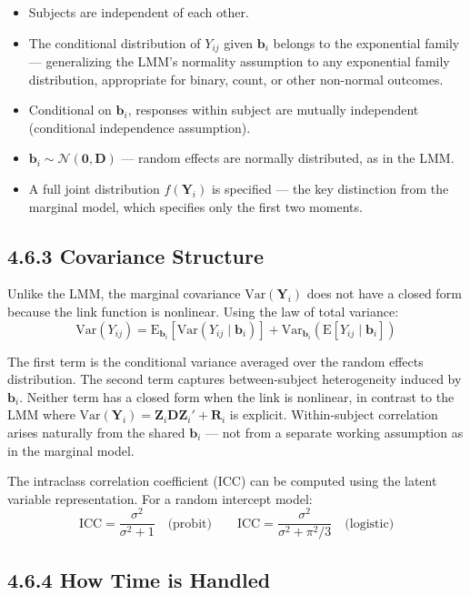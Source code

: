 \documentclass[11pt]{article}
\newcommand{\bY}{\mathbf{Y}}
\newcommand{\bZ}{\mathbf{Z}}
\newcommand{\E}{\mathrm{E}}
\newcommand{\Var}{\mathrm{Var}}
\newcommand{\Normal}{\mathcal{N}}
\begin{document}
\begin{itemize}[leftmargin=2em]
  \item Subjects are independent of each other.
  \item The conditional distribution of $Y_{ij}$ given $\mathbf{b}_i$ belongs to the exponential family --- generalizing the LMM's normality assumption to any exponential family distribution, appropriate for binary, count, or other non-normal outcomes.
  \item Conditional on $\mathbf{b}_i$, responses within subject are mutually independent (conditional independence assumption).
  \item $\mathbf{b}_i \sim \Normal(\mathbf{0}, \mathbf{D})$ --- random effects are normally distributed, as in the LMM.
  \item A full joint distribution $f(\bY_i)$ is specified --- the key distinction from the marginal model, which specifies only the first two moments.
\end{itemize}

\subsection*{4.6.3 Covariance Structure}

Unlike the LMM, the marginal covariance $\Var(\bY_i)$ does not have a closed form because the link function is nonlinear. Using the law of total variance:
$$\Var(Y_{ij}) = \E_{\mathbf{b}_i}[\Var(Y_{ij} \mid \mathbf{b}_i)] + \Var_{\mathbf{b}_i}(\E[Y_{ij} \mid \mathbf{b}_i])$$

The first term is the conditional variance averaged over the random effects distribution. The second term captures between-subject heterogeneity induced by $\mathbf{b}_i$. Neither term has a closed form when the link is nonlinear, in contrast to the LMM where $\Var(\bY_i) = \bZ_i\mathbf{D}\bZ_i' + \mathbf{R}_i$ is explicit. Within-subject correlation arises naturally from the shared $\mathbf{b}_i$ --- not from a separate working assumption as in the marginal model.

The intraclass correlation coefficient (ICC) can be computed using the latent variable representation. For a random intercept model:
$$\text{ICC} = \frac{\sigma^2}{\sigma^2 + 1} \quad \text{(probit)} \qquad \text{ICC} = \frac{\sigma^2}{\sigma^2 + \pi^2/3} \quad \text{(logistic)}$$

\subsection*{4.6.4 How Time is Handled}
\end{document}
